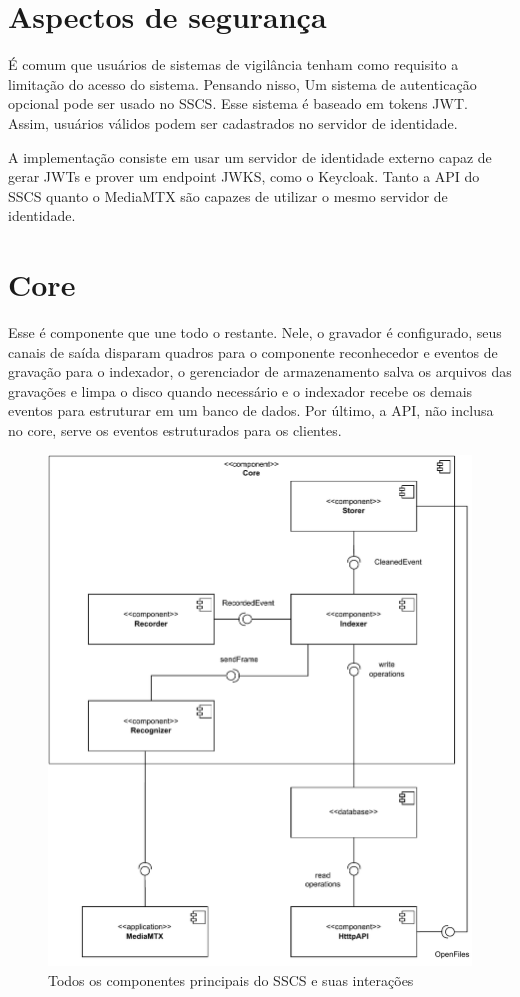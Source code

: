\documentclass[12pt, %
openright, 
oneside, %
a4paper,    %
brazil]{facom-ufu-abntex2}
\begin{document}
\section{Aspectos de segurança}

É comum que usuários de sistemas de vigilância tenham como requisito a
limitação do acesso do sistema. Pensando nisso, Um sistema de autenticação
opcional pode ser usado no SSCS. Esse sistema é baseado em tokens JWT. Assim,
usuários válidos podem ser cadastrados no servidor de identidade.

A implementação consiste em usar um servidor de identidade externo capaz de
gerar JWTs e prover um endpoint JWKS, como o Keycloak. Tanto a API do SSCS
quanto o MediaMTX são capazes de utilizar o mesmo servidor de identidade.

\section{Core}
Esse é componente que une todo o restante. Nele, o gravador é configurado, seus
canais de saída disparam quadros para o componente reconhecedor e eventos de
gravação para o indexador, o gerenciador de armazenamento salva os arquivos das
gravações e limpa o disco quando necessário e o indexador recebe os demais
eventos para estruturar em um banco de dados. Por último, a API, não inclusa no
core, serve os eventos estruturados para os clientes.

\begin{figure}[!ht]
	\centering
	\includegraphics[width=1.0\linewidth]{core.pdf}
	\caption[Diagrama geral do SSCS]{Todos os componentes principais do
		SSCS e suas interações}
	\label{fig:graficosVariandoTamanhoRede}
\end{figure}
\end{document}
